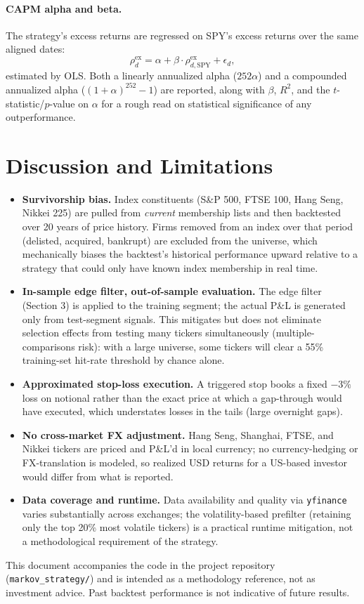 \documentclass[11pt]{article}
\begin{document}
\paragraph{CAPM alpha and beta.} The strategy's excess returns are
regressed on SPY's excess returns over the same aligned dates:
\[
  \rho_d^{\text{ex}} = \alpha + \beta \cdot \rho_{d,\text{SPY}}^{\text{ex}} + \epsilon_d,
\]
estimated by OLS. Both a linearly annualized alpha ($252\alpha$) and a
compounded annualized alpha ($(1+\alpha)^{252}-1$) are reported, along with
$\beta$, $R^2$, and the $t$-statistic/$p$-value on $\alpha$ for a rough
read on statistical significance of any outperformance.

\section{Discussion and Limitations}

\begin{itemize}
  \item \textbf{Survivorship bias.} Index constituents (S\&P 500, FTSE 100,
  Hang Seng, Nikkei 225) are pulled from \emph{current} membership lists
  and then backtested over 20 years of price history. Firms removed from
  an index over that period (delisted, acquired, bankrupt) are excluded
  from the universe, which mechanically biases the backtest's historical
  performance upward relative to a strategy that could only have known
  index membership in real time.
  \item \textbf{In-sample edge filter, out-of-sample evaluation.} The edge
  filter (Section 3) is applied to the training segment; the actual P\&L
  is generated only from test-segment signals. This mitigates but does not
  eliminate selection effects from testing many tickers simultaneously
  (multiple-comparisons risk): with a large universe, some tickers will
  clear a 55\% training-set hit-rate threshold by chance alone.
  \item \textbf{Approximated stop-loss execution.} A triggered stop books a
  fixed $-3\%$ loss on notional rather than the exact price at which a
  gap-through would have executed, which understates losses in the tails
  (large overnight gaps).
  \item \textbf{No cross-market FX adjustment.} Hang Seng, Shanghai, FTSE,
  and Nikkei tickers are priced and P\&L'd in local currency; no
  currency-hedging or FX-translation is modeled, so realized USD returns
  for a US-based investor would differ from what is reported.
  \item \textbf{Data coverage and runtime.} Data availability and quality
  via \texttt{yfinance} varies substantially across exchanges; the
  volatility-based prefilter (retaining only the top 20\% most volatile
  tickers) is a practical runtime mitigation, not a methodological
  requirement of the strategy.
\end{itemize}

This document accompanies the code in the project repository
(\texttt{markov\_strategy/}) and is intended as a methodology reference,
not as investment advice. Past backtest performance is not indicative of
future results.
\end{document}
